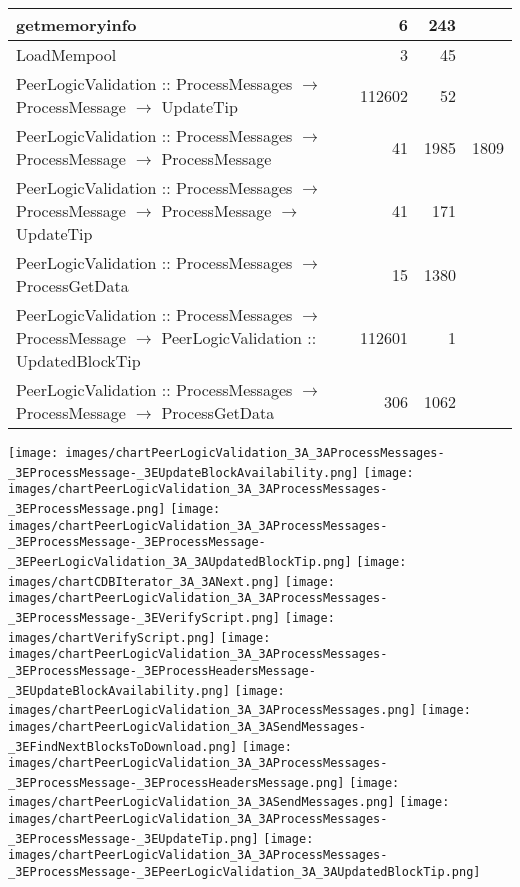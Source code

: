 \documentclass{article}
\begin{document}
\begin{tabular}{P{5cm}|r|r|r}
getmemoryinfo& 6& 243&\\\hline
LoadMempool& 3& 45&\\\hline
PeerLogicValidation :: ProcessMessages $\to$ ProcessMessage $\to$ UpdateTip& 112602& 52&\\\hline
PeerLogicValidation :: ProcessMessages $\to$ ProcessMessage $\to$ ProcessMessage& 41& 1985&1809\\\hline
PeerLogicValidation :: ProcessMessages $\to$ ProcessMessage $\to$ ProcessMessage $\to$ UpdateTip& 41& 171&\\\hline
PeerLogicValidation :: ProcessMessages $\to$ ProcessGetData& 15& 1380&\\\hline
PeerLogicValidation :: ProcessMessages $\to$ ProcessMessage $\to$ PeerLogicValidation :: UpdatedBlockTip& 112601& 1&\\\hline
PeerLogicValidation :: ProcessMessages $\to$ ProcessMessage $\to$ ProcessGetData& 306& 1062&\\\hline
\end{tabular}

\texttt{[image: images/chartPeerLogicValidation\_3A\_3AProcessMessages-\_3EProcessMessage-\_3EUpdateBlockAvailability.png]}
\texttt{[image: images/chartPeerLogicValidation\_3A\_3AProcessMessages-\_3EProcessMessage.png]}
\texttt{[image: images/chartPeerLogicValidation\_3A\_3AProcessMessages-\_3EProcessMessage-\_3EProcessMessage-\_3EPeerLogicValidation\_3A\_3AUpdatedBlockTip.png]}
\texttt{[image: images/chartCDBIterator\_3A\_3ANext.png]}
\texttt{[image: images/chartPeerLogicValidation\_3A\_3AProcessMessages-\_3EProcessMessage-\_3EVerifyScript.png]}
\texttt{[image: images/chartVerifyScript.png]}
\texttt{[image: images/chartPeerLogicValidation\_3A\_3AProcessMessages-\_3EProcessMessage-\_3EProcessHeadersMessage-\_3EUpdateBlockAvailability.png]}
\texttt{[image: images/chartPeerLogicValidation\_3A\_3AProcessMessages.png]}
\texttt{[image: images/chartPeerLogicValidation\_3A\_3ASendMessages-\_3EFindNextBlocksToDownload.png]}
\texttt{[image: images/chartPeerLogicValidation\_3A\_3AProcessMessages-\_3EProcessMessage-\_3EProcessHeadersMessage.png]}
\texttt{[image: images/chartPeerLogicValidation\_3A\_3ASendMessages.png]}
\texttt{[image: images/chartPeerLogicValidation\_3A\_3AProcessMessages-\_3EProcessMessage-\_3EUpdateTip.png]}
\texttt{[image: images/chartPeerLogicValidation\_3A\_3AProcessMessages-\_3EProcessMessage-\_3EPeerLogicValidation\_3A\_3AUpdatedBlockTip.png]}
\end{document}

